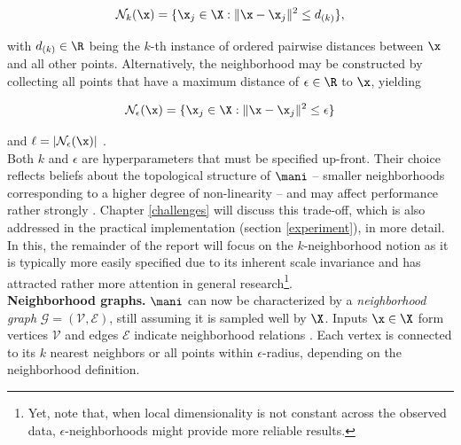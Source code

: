 \begin{equation}
  \mathcal{N}_k(\x) = \{\x_j \in \X: \| \x - \x_j \|^2 \leq d_{(k)}\},
  \label{eq-kneighborhood}
\end{equation}

with $d_{(k)} \in \R$ being the $k$-th instance of ordered pairwise distances 
between $\x$ and all other points.
Alternatively, the neighborhood may be constructed by collecting all points that
have a maximum distance of $\epsilon \in \R$ to $\x$, yielding 

\begin{equation}
  \mathcal{N}_{\epsilon} (\x) = \{\x_j \in \X: \| \x - \x_j \|^2 \leq \epsilon\}
  \label{eq-epsneighborhood}
\end{equation}

and $\ell = |\mathcal{N}_{\epsilon} (\x)|$ \citep{heetal2005}.
\\

Both $k$ and $\epsilon$ are hyperparameters that must be specified up-front.
Their choice reflects beliefs about the topological structure of $\mani$ -- 
smaller neighborhoods corresponding to a higher degree of non-linearity -- and 
may affect performance rather strongly \citep{sudderth2002}.
Chapter \ref{challenges} will discuss this trade-off, which is also addressed in 
the practical implementation (section \ref{experiment}), in more detail.
In this, the remainder of the report will focus on the $k$-neighborhood notion 
as it is typically more easily specified due to its inherent scale invariance 
and has attracted rather more attention in general research\footnote{
Yet, \citet{tenenbaumdesilvalangford2000} note that, when local dimensionality 
is not constant across the observed data, $\epsilon$-neighborhoods might provide 
more reliable results.
}. 
\\

\textbf{Neighborhood graphs.}
$\mani$ can now be characterized by a \textit{neighborhood 
graph} $\mathcal{G} = (\mathcal{V}, \mathcal{E})$, still assuming it is 
sampled well by $\X$. 
Inputs $\x \in \X$ form vertices $\mathcal{V}$ and edges $\mathcal{E}$ 
indicate neighborhood relations \citep{belkinniyogi2001}.
Each vertex is connected to its $k$ nearest neighbors or all points 
within $\epsilon$-radius, depending on the neighborhood definition.

